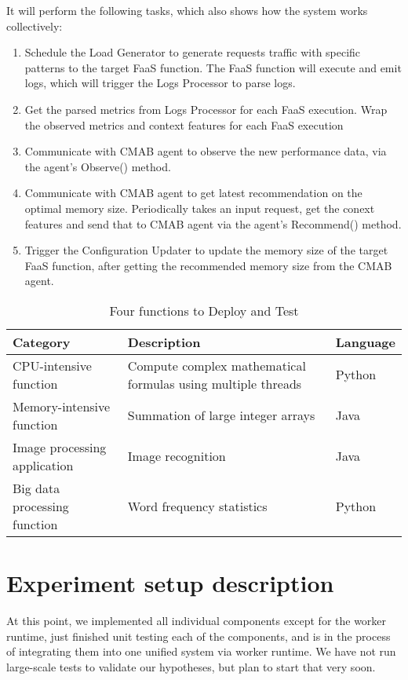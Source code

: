 \documentclass[conference]{IEEEtran}
\begin{document}
\begin{itemize}
It will perform the following tasks, which also shows how the system works collectively:
\begin{enumerate}
\item Schedule the Load Generator to generate requests traffic with specific patterns to the target FaaS function. The FaaS function will execute and emit logs, which will trigger the Logs Processor to parse logs.
\item Get the parsed metrics from Logs Processor for each FaaS execution. Wrap the observed metrics and context features for each FaaS execution
\item Communicate with CMAB agent to observe the new performance data, via the agent's Observe() method.
\item Communicate with CMAB agent to get latest recommendation on the optimal memory size. Periodically takes an input request, get the conext features and send that to CMAB agent via the agent's Recommend() method.
\item Trigger the Configuration Updater to update the memory size of the target FaaS function, after getting the recommended memory size from the CMAB agent.

\end{enumerate}

\end{itemize}

\begin{table*}
\centering

\begin{tabular}{| l | l | l |}
\hline
Category & Description & Language \\
\hline

\hline
CPU-intensive function & Compute complex mathematical formulas using multiple threads & Python \\
\hline
Memory-intensive function & Summation of large integer arrays & Java \\
\hline
Image processing application & Image recognition & Java \\
\hline
Big data processing function & Word frequency statistics & Python \\
\hline

\end{tabular}
\caption{Four functions to Deploy and Test}
\label{table: 1}
\end{table*}


\section{Experiment setup description}
At this point, we implemented all individual components except for the worker runtime, just finished unit testing each of the components, and is in the process of integrating them into one unified system via worker runtime. We have not run large-scale tests to validate our hypotheses, but plan to start that very soon. 
\end{document}
